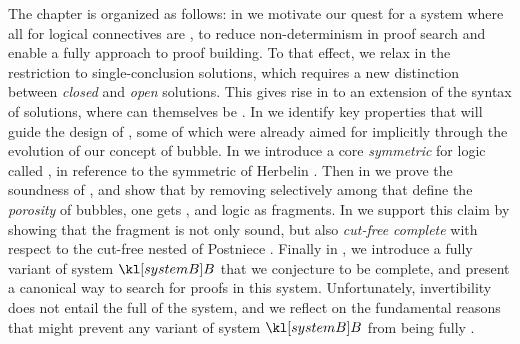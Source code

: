 \begin{scope}
The chapter is organized as follows: in  we motivate our
quest for a system where all  for logical connectives are
\emph{}, to reduce non-determinism in proof search and enable a fully
\emph{} approach to proof building. To that effect, we relax in
 the restriction to single-conclusion solutions, which
requires a new distinction between \emph{closed} and \emph{open} solutions. This
gives rise in  to an extension of the syntax of solutions, where
 can themselves be \emph{}. In  we identify
key properties that will guide the design of , some of which were
already aimed for implicitly through the evolution of our concept of bubble. In
 we introduce a core \emph{symmetric }
for  logic called , in reference to the symmetric
 of Herbelin . Then in
 we prove the soundness of , and show
that by removing selectively among  that define the
\emph{porosity} of  bubbles, one gets ,
 and  logic as fragments. In
 we support this claim by showing that the
 fragment is not only sound, but also \emph{cut-free complete}
with respect to the cut-free nested   of Postniece
\cite{postniece_deep_2009}. Finally in , we
introduce a fully  variant of system $\sysB$ that we conjecture to be
complete, and present a canonical way to search for proofs in this system.
Unfortunately, invertibility does not entail the full  of the system,
and we reflect on the fundamental reasons that might prevent any variant of
system $\sysB$ from being fully .



\end{scope}
